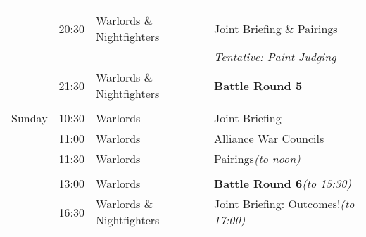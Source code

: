 \begin{center}
\begin{tabular}{C{0.75in}C{0.75in}C{2in}L{2.75in}}
                                & & & \\
                                & 20:30 & Warlords \& Nightfighters & Joint Briefing \& Pairings\\
                                &       &                           & \emph{Tentative: Paint Judging}\\
                                & 21:30 & Warlords \& Nightfighters & \textbf{Battle Round 5}\\
\\
   Sunday   & 10:30 & Warlords                  & Joint Briefing\\
            & 11:00 & Warlords                  & Alliance War Councils\\
            & 11:30 & Warlords                  & Pairings\hfill\textit{(to noon)}\\
 & & & \\
            & 13:00 & Warlords                  & \textbf{Battle Round 6}\hfill\textit{(to 15:30)}\\
            & 16:30 & Warlords \& Nightfighters & Joint Briefing: Outcomes!\hfill\textit{(to 17:00)}\\
\end{tabular}
\end{center}

